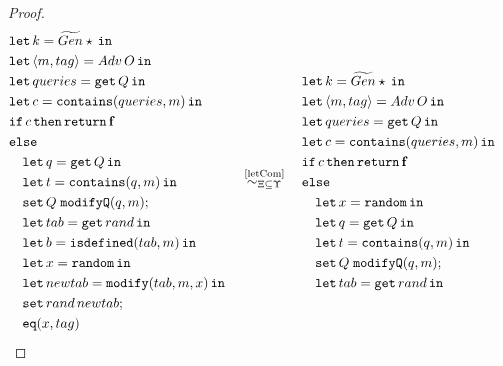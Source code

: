 \begin{proof}
\small{
\begin{align*}
    &\begin{aligned}
        &\letin{k = \widetilde{Gen} \star}{} \\
        &\letin{\lis{m,tag} = Adv\,O}{} \\
        &\letin{queries = \get Q}{} \\
        &\letin{c=\mathtt{contains}(queries, m)}{} \\
        & \mathtt{if}\, c\, \mathtt{then} \, \return \false \\
        &\mathtt{else} \\
        &\quad\letin{q=\get Q}{} \\
        &\quad\letin{t=\mathtt{contains}(q,m)}{} \\
        &\quad \mathtt{set}\,Q\;\mathtt{modifyQ}(q, m); \\
        &\quad\letin{tab = \mathtt{get}\,rand}{} \\
        &\quad\letin{b = \mathtt{isdefined}(tab, m)}{} \\
        &\quad \letin{x = \random}{} \\
        &\quad \letin{newtab = \mathtt{modify}(tab, m, x)}{} \\
        &\quad \mathtt{set}\,rand\,newtab; \\
        &\quad \mathtt{eq}(x,tag)
    \end{aligned}
    \quad\overset{\text{\ref{letCom}}}{\simcontext}\quad
    \begin{aligned}
        &\letin{k = \widetilde{Gen} \star}{} \\
        &\letin{\lis{m,tag} = Adv\,O}{} \\
        &\letin{queries = \get Q}{} \\
        &\letin{c=\mathtt{contains}(queries, m)}{} \\
        & \mathtt{if}\, c\, \mathtt{then} \, \return \false \\
        &\mathtt{else} \\
        &\quad \letin{x = \random}{} \\
        &\quad\letin{q=\get Q}{} \\
        &\quad\letin{t=\mathtt{contains}(q,m)}{} \\
        &\quad \mathtt{set}\,Q\;\mathtt{modifyQ}(q, m); \\
        &\quad\letin{tab = \mathtt{get}\,rand}{} \\

\end{aligned}
\end{align*}}
\end{proof}
